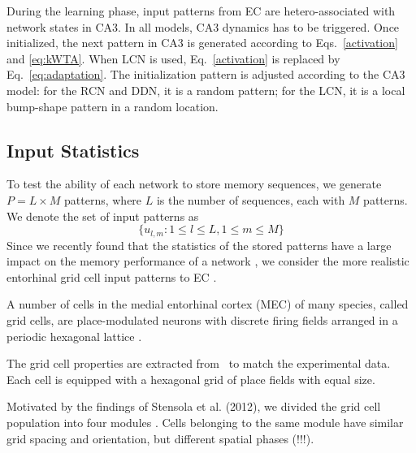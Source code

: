 \documentclass[utf8]{frontiersSCNS} %
\begin{document}
During the learning phase, input patterns from EC are hetero-associated with network states in CA3. In all models, CA3 dynamics has to be triggered. Once initialized, the next pattern in CA3 is generated according to Eqs.~\ref{activation} and \ref{eq:kWTA}. When LCN is used, Eq.~\ref{activation} is replaced by Eq.~\ref{eq:adaptation}. The initialization pattern is adjusted according to the CA3 model: for the RCN and DDN, it is a random pattern; for the LCN, it is a local bump-shape pattern in a random location.


\subsection{Input Statistics}

To test the ability of each network to store memory sequences, we generate $P = L \times M$ patterns, where $L$ is the number of sequences, each with $M$ patterns. We denote the set of input patterns as 
\begin{equation}
	\{ u_{l,m}: 1\le l \le L, 1\le m \le M \}
\end{equation}
Since we recently found that the statistics of the stored patterns have a large impact on the memory performance of a network \cite{neher2015memory}, we consider the more realistic entorhinal grid cell input patterns to EC \cite{hafting2005microstructure}. 





A number of cells in the medial entorhinal cortex (MEC) of many species, called grid cells, are place-modulated neurons with discrete firing fields arranged in a periodic hexagonal lattice \cite{hafting2005microstructure}.  

The grid cell properties are extracted from~\cite{stensola2012entorhinal} to match the experimental data.
Each cell is equipped with a hexagonal grid of place fields with equal size.

Motivated by the findings of Stensola et al. (2012), we divided the grid cell population into four modules \cite{stensola2012entorhinal}. Cells belonging to the same module have similar grid spacing and orientation, but different spatial phases (!!!). 
\end{document}
